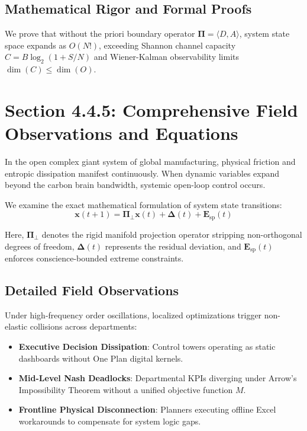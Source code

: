 \documentclass[12pt,a4paper,oneside]{book}
\begin{document}
\subsection*{Mathematical Rigor and Formal Proofs}
We prove that without the priori boundary operator $\mathbf{\Pi} = \langle D, A \rangle$, system state space expands as $O(N!)$, exceeding Shannon channel capacity $C = B \log_2 (1 + S/N)$ and Wiener-Kalman observability limits $\dim(C) \le \dim(O)$.
\clearpage
\section{Section 4.4.5: Comprehensive Field Observations and Equations}

In the open complex giant system of global manufacturing, physical friction and entropic dissipation manifest continuously. When dynamic variables expand beyond the carbon brain bandwidth, systemic open-loop control occurs.

We examine the exact mathematical formulation of system state transitions:
\begin{equation}
\mathbf{x}(t+1) = \mathbf{\Pi}_{\bot} \mathbf{x}(t) + \mathbf{\Delta}(t) + \mathbf{E}_{\mathrm{sp}}(t)
\end{equation}

Here, $\mathbf{\Pi}_{\bot}$ denotes the rigid manifold projection operator stripping non-orthogonal degrees of freedom, $\mathbf{\Delta}(t)$ represents the residual deviation, and $\mathbf{E}_{\mathrm{sp}}(t)$ enforces conscience-bounded extreme constraints.

\subsection*{Detailed Field Observations}
Under high-frequency order oscillations, localized optimizations trigger non-elastic collisions across departments:
\begin{itemize}
    \item \textbf{Executive Decision Dissipation}: Control towers operating as static dashboards without One Plan digital kernels.
    \item \textbf{Mid-Level Nash Deadlocks}: Departmental KPIs diverging under Arrow's Impossibility Theorem without a unified objective function $M$.
    \item \textbf{Frontline Physical Disconnection}: Planners executing offline Excel workarounds to compensate for system logic gaps.
\end{itemize}
\end{document}
